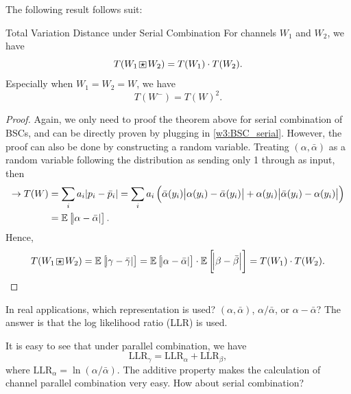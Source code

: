 The following result follows suit:
\begin{theorem}{Total Variation Distance under Serial Combination} \label{thm:w5_TV_multiply}
    For channels $W_1$ and $W_2$, we have
    \begin{equation}
        T(W_1\boxstar W_2) = T(W_1) \cdot T(W_2).
    \end{equation}
    Especially when $W_1=W_2=W$, we have
    \begin{equation}
        T(W^-) = T(W)^2.
    \end{equation}
\end{theorem}
\begin{proof}
    Again, we only need to proof the theorem above for serial combination of BSCs, and can be directly proven by plugging in \autoref{w3:BSC_serial}. However, the proof can also be done by constructing a random variable. Treating $(\alpha,\bar{\alpha})$ as a random variable following the distribution as sending only 1 through as input, then
    \begin{align*}
        \rightarrow T(W) &= \sum_{i} a_i \abs{p_i-\bar{p}_i} = \sum_i a_i \left(\bar{\alpha}(y_i) \abs{\alpha(y_i)-\bar{\alpha}(y_i)} + {\alpha}(y_i) \abs{\bar{\alpha}(y_i)-{\alpha}(y_i)}\right) \\
        &= \mathbb{E}\left[\abs{\alpha-\bar{\alpha}}\right].
    \end{align*}
    Hence,
    \begin{align*}
        T(W_1\boxstar W_2) = \mathbb{E}\left[\abs{\gamma-\bar{\gamma}}\right] = \mathbb{E}\left[\abs{\alpha-\bar{\alpha}}\right] \cdot \mathbb{E}\left[\abs{\beta-\bar{\beta}}\right] = T(W_1)\cdot T(W_2).
    \end{align*}
\end{proof}


In real applications, which representation is used? $(\alpha,\bar{\alpha})$, $\alpha/\bar{\alpha}$, or $\alpha-\bar{\alpha}$? The answer is that the log likelihood ratio (LLR) is used.

It is easy to see that under parallel combination, we have
\begin{equation}
    \mathrm{LLR}_\gamma = \mathrm{LLR}_\alpha + \mathrm{LLR}_\beta, \label{eq:w5_LLR_add}
\end{equation}
where $\mathrm{LLR}_\alpha = \ln(\alpha/\bar{\alpha})$. The additive property makes the calculation of channel parallel combination very easy. How about serial combination?

